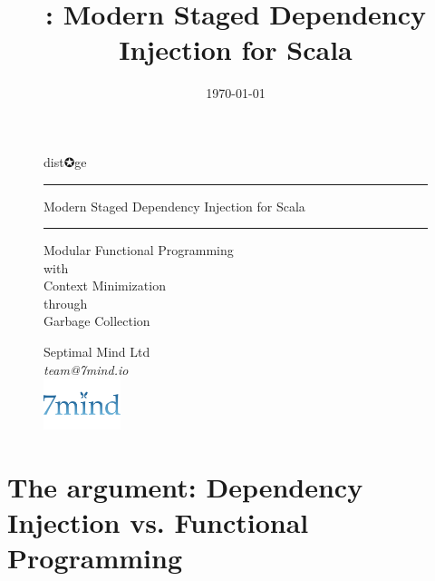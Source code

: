 \documentclass[usenames,dvipsnames]{beamer}
\title[\distage]{\distage: Modern Staged Dependency Injection for Scala}
\institute[Septimal Mind Ltd]
    {
    Septimal Mind Ltd\\
    \medskip
    \textit{team@7mind.io}
    }
\date{\today}
\begin{document}

\begin{frame}
\begin{figure}
\Huge
\color{RubineRed} dist✪ge
\noindent
\rule{\linewidth}{1mm}
\Large Modern Staged Dependency Injection for Scala
\rule{\linewidth}{1mm}
\end{figure}

\begin{figure}
\color{RubineRed}
\normalsize Modular Functional Programming \\
with \\
Context Minimization \\
through \\
Garbage Collection
\end{figure}



\begin{figure}
  Septimal Mind Ltd \\
  \textit{team@7mind.io} \\
  \includegraphics[width=0.2\textwidth]{media/logo_7mind.png}
\end{figure}

\end{frame}

\section{The argument: Dependency Injection vs. Functional Programming}
\end{document}
